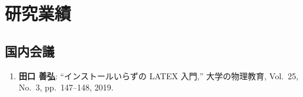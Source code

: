\documentclass[../main]{subfiles}
\begin{document}
\chapter{研究業績}
\label{achive}

\thispagestyle{empty}

\newpage


\section*{国内会議}
\begin{enumerate}
  \item \textbf{田口 善弘}: ``インストールいらずの LATEX 入門,'' 大学の物理教育, Vol.~25, No.~3, pp.~147--148, 2019.\\
\end{enumerate}



\end{document}

